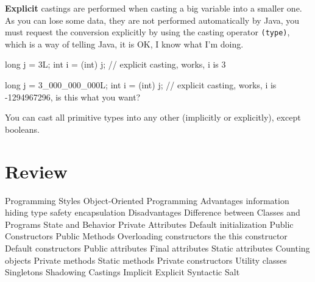 \documentclass[a4paper, 9pt]{extarticle}
\begin{document}
\textbf{Explicit} castings are performed when casting a big variable into a smaller one.
As you can lose some data, they are not performed automatically by Java, you
must request the conversion explicitly by using the casting operator
\verb+(type)+, which is a way of telling Java, it is OK, I know what I'm doing.

\begin{blackboard}
long j = 3L;
int i = (int) j; // explicit casting, works, i is 3

long j = 3_000_000_000L;
int i = (int) j; // explicit casting, works, i is -1294967296, is this what you want?
\end{blackboard}

You can cast all primitive types into any other (implicitly or explicitly),
except booleans.





\section{Review}

\begin{blackboard}
Programming Styles
Object-Oriented Programming
  Advantages
    information hiding
    type safety
    encapsulation
  Disadvantages
Difference between Classes and Programs
State and Behavior
Private Attributes
  Default initialization
Public Constructors
Public Methods
Overloading constructors
the this constructor
Default constructors
Public attributes
Final attributes
Static attributes
  Counting objects
Private methods
Static methods
Private constructors
  Utility classes
  Singletons
Shadowing
Castings
  Implicit
  Explicit
  Syntactic Salt
\end{blackboard}
\end{document}
